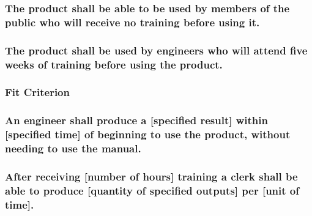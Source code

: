 \documentclass[
]{article}
\begin{document}
\hypertarget{the-product-shall-be-able-to-be-used-by-members-of-the-public-who-will-receive-no-training-before-using-it.}{%
\subsubsection{The product shall be able to be used by members of the
public who will receive no training before using
it.}\label{the-product-shall-be-able-to-be-used-by-members-of-the-public-who-will-receive-no-training-before-using-it.}}

\hypertarget{the-product-shall-be-used-by-engineers-who-will-attend-five-weeks-of-training-before-using-the-product.}{%
\subsubsection{The product shall be used by engineers who will attend
five weeks of training before using the
product.}\label{the-product-shall-be-used-by-engineers-who-will-attend-five-weeks-of-training-before-using-the-product.}}

\hypertarget{fit-criterion-4}{%
\subsubsection{Fit Criterion}\label{fit-criterion-4}}

\hypertarget{an-engineer-shall-produce-a-specified-result-within-specified-time-of-beginning-to-use-the-product-without-needing-to-use-the-manual.}{%
\subsubsection{An engineer shall produce a {[}specified result{]} within
{[}specified time{]} of beginning to use the product, without needing to
use the
manual.}\label{an-engineer-shall-produce-a-specified-result-within-specified-time-of-beginning-to-use-the-product-without-needing-to-use-the-manual.}}

\hypertarget{after-receiving-number-of-hours-training-a-clerk-shall-be-able-to-produce-quantity-of-specified-outputs-per-unit-of-time.}{%
\subsubsection{After receiving {[}number of hours{]} training a clerk
shall be able to produce {[}quantity of specified outputs{]} per {[}unit
of
time{]}.}\label{after-receiving-number-of-hours-training-a-clerk-shall-be-able-to-produce-quantity-of-specified-outputs-per-unit-of-time.}}
\end{document}
